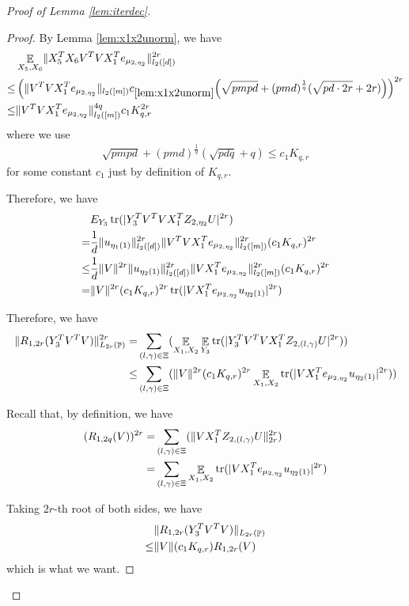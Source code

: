 \documentclass[11pt]{amsart}
\numberwithin{equation}{section}
\numberwithin{equation}{section}
\DeclareMathOperator{\E}{\mathbb{E}}
\DeclareMathOperator{\Pb}{\mathbb{P}}
\DeclareMathOperator*{\tr}{tr}
\DeclarePairedDelimiter{\norm}{\lVert}{\rVert}
\DeclarePairedDelimiter{\paren}{(}{)}
\begin{document}
\begin{proof}[Proof of Lemma \ref{lem:iterdec}]
\begin{proof}
By Lemma \ref{lem:x1x2unorm}, we have
\begin{align*}
&\E_{X_5,X_6}\norm{X_5^TX_6V^TVX_1^Te_{\mu_{2,\eta_2}}}_{l_2([d])}^{2r} \\\le& \left(\norm{V^TVX_1^Te_{\mu_{2,\eta_2}}}_{l_2([m])}c_{\ref{lem:x1x2unorm}}\paren*{\sqrt{pmpd}+ (pmd)^\frac{1}{q} (\sqrt{pd\cdot 2r} + 2r)}\right)^{2r}
\\\le&\norm{V^TVX_1^Te_{\mu_{2,\eta_2}}}_{l_2([m])}^{4q}c_1K_{q,r}^{2r}
\end{align*}
where we use
\begin{align*}
    \sqrt{pmpd}+ (pmd)^\frac{1}{q} (\sqrt{pdq} + q) \le c_1K_{q,r}
\end{align*}
for some constant $c_1$ just by definition of $K_{q,r}$.

Therefore, we have
\begin{align*}
    &E_{Y_3}\tr(|Y_3^TV^TVX_1^TZ_{2,\eta_2}U|^{2r})
\\=&\frac 1 d\norm{u_{\eta_1(1)}}_{l_2([d])}^{2r}\norm{V^TVX_1^Te_{\mu_{2,\eta_2}}}_{l_2([m])}^{2r}(c_{1}K_{q,r})^{2r}
\\ \le & \frac 1 d\norm{V}^{2r} \norm{u_{\eta_2(1)}}_{l_2([d])}^{2r}\norm{VX_1^Te_{\mu_{2,\eta_2}}}_{l_2([m])}^{2r}(c_{1}K_{q,r})^{2r}
\\=&\norm{V}^{2r} (c_{1}K_{q,r})^{2r} \tr(|VX_1^Te_{\mu_{2,\eta_2}}u_{\eta_2(1)}|^{2r})
\end{align*}


Therefore, we have
\begin{align*}
    \norm{R_{1,2r}(Y_3^TV^TV)}_{L_{2r}(\Pb)}^{2r}  
    = &  \sum\limits_{(l,\gamma) \in \Xi}(\E_{X_1,X_2} \E_{Y_3}\tr(|Y_3^TV^TVX_1^TZ_{2,(l,\gamma)}U|^{2r}))
    \\ \le &\sum\limits_{(l,\gamma) \in \Xi}( \norm{V}^{2r} (c_{1}K_{q,r})^{2r} \E_{X_1,X_2}\tr(|VX_1^Te_{\mu_{2,\eta_2}}u_{\eta_2(1)}|^{2r}))
\end{align*}

Recall that, by definition, we have
\begin{align*}
    (R_{1,2q}(V))^{2r}=&\sum\limits_{(l,\gamma) \in \Xi}(\norm{VX_1^TZ_{2,(l,\gamma)}U}_{2r}^{2r})
    \\=&\sum\limits_{(l,\gamma) \in \Xi}\E_{X_1,X_2}\tr(|VX_1^Te_{\mu_{2,\eta_2}}u_{\eta_2(1)}|^{2r})
\end{align*}

Taking $2r$-th root of both sides, we have
\begin{align*}
    &\norm{R_{1,2r}(Y_3^TV^TV)}_{L_{2r}(\Pb)}  
    \\ \le &\norm{V} (c_{1}K_{q,r})R_{1,2r}(V)
\end{align*}
which is what we want.


\end{proof}
\end{proof}
\end{document}
